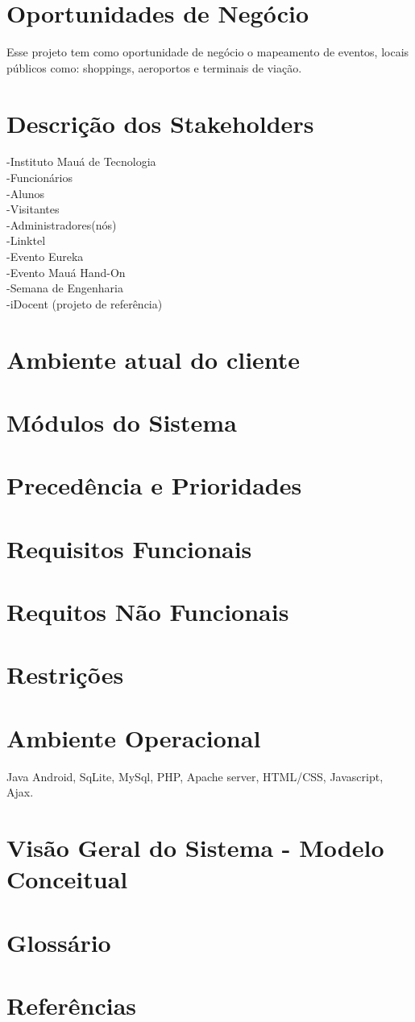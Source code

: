 \documentclass[13pt]{article}
\begin{document}
\section*{Oportunidades de Negócio}
	Esse projeto tem como oportunidade de negócio o mapeamento de eventos, locais públicos como: shoppings, aeroportos e terminais de viação.

\section*{Descrição dos Stakeholders}
	-Instituto Mauá de Tecnologia \\
	-Funcionários \\
	-Alunos \\
	-Visitantes \\
	-Administradores(nós)\\
	-Linktel \\
	-Evento Eureka \\
	-Evento Mauá Hand-On \\
	-Semana de Engenharia \\
	-iDocent (projeto de referência) \\ 
	
\section*{Ambiente atual do cliente}
\section*{Módulos do Sistema}
\section*{Precedência e Prioridades}
\section*{Requisitos Funcionais}
\section*{Requitos Não Funcionais}
\section*{Restrições}
\section*{Ambiente Operacional}
Java Android, SqLite, MySql, PHP, Apache server, HTML/CSS, Javascript, Ajax.
\section*{Visão Geral do Sistema - Modelo Conceitual}
\section*{Glossário}

\section*{Referências}

 
\end{document}
